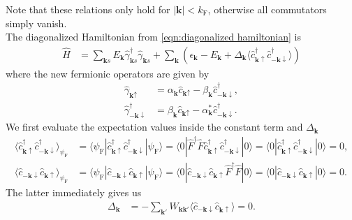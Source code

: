 \documentclass[english, parskip=full]{scrartcl}
\renewcommand{\bra}{}
\renewcommand{\braket}{}
\newcommand{\kla}{}
\newcommand{\tecxt}{}
\begin{document}
Note that these relations only hold for $|\textbf{k}| < k_\tecxt\text{F}$, otherwise all commutators simply vanish.
\\
The diagonalized Hamiltonian from \autoref{eqn:diagonalized hamiltonian} is 
\begin{align}
\hat{H} &= \sum_{\mathbf{k}s} E_{\mathbf{k}} \hat{\gamma}_{\mathbf{k}s}^\dagger \hat{\gamma}_{\mathbf{k}s} + \sum_{\textbf{k}}\kla\left(  \epsilon_\textbf{k} - E_\textbf{k} + \Delta_\textbf{k} \langle \hat{c}_{\mathbf{k}\uparrow}^\dagger \hat{c}_{-\mathbf{k}\downarrow}^\dagger \rangle \right)
\end{align}
where the new fermionic operators are given by
\begin{align}
\hat{\gamma}_{\textbf{k}\uparrow} &= \alpha_\textbf{k} \hat{c}_{\textbf{k}\uparrow} - \beta_\textbf{k} \hat{c}_{-\textbf{k}\downarrow}^\dagger,\\
\hat{\gamma}_{-\textbf{k}\downarrow}^\dagger &= \beta_\textbf{k} \hat{c}_{\textbf{k}\uparrow} - \alpha^\ast_\textbf{k} \hat{c}_{-\textbf{k}\downarrow}^\dagger.
\end{align}
We first evaluate the expectation values inside the constant term and $\Delta_\textbf{k}$
\begin{align}
\bra\langle \hat{c}_{\mathbf{k}\uparrow}^\dagger \hat{c}_{-\mathbf{k}\downarrow}^\dagger \rangle_{\psi_\tecxt\text{F}} &= \braket\langle \psi_\tecxt\text{F} | \hat{c}_{\mathbf{k}\uparrow}^\dagger \hat{c}_{-\mathbf{k}\downarrow}^\dagger | \psi_\tecxt\text{F} \rangle = \braket\langle 0 | \hat{F}^\dagger \hat{F} \hat{c}_{\mathbf{k}\uparrow}^\dagger \hat{c}_{-\mathbf{k}\downarrow}^\dagger | 0 \rangle = \braket\langle 0 | \hat{c}_{\mathbf{k}\uparrow}^\dagger \hat{c}_{-\mathbf{k}\downarrow}^\dagger | 0 \rangle = 0,\\
\bra\langle \hat{c}_{-\mathbf{k}\downarrow} \hat{c}_{\mathbf{k}\uparrow} \rangle_{\psi_\tecxt\text{F}} &= \braket\langle \psi_\tecxt\text{F} | \hat{c}_{-\mathbf{k}\downarrow} \hat{c}_{\mathbf{k}\uparrow} | \psi_\tecxt\text{F} \rangle = \braket\langle 0 | \hat{c}_{-\mathbf{k}\downarrow} \hat{c}_{\mathbf{k}\uparrow} \hat{F}^\dagger \hat{F} | 0 \rangle = \braket\langle 0 | \hat{c}_{-\mathbf{k}\downarrow} \hat{c}_{\mathbf{k}\uparrow} | 0 \rangle = 0.
\end{align}
The latter immediately gives us
\begin{align}
\Delta_\textbf{k} &= -\sum_{\textbf{k}'} W_{\textbf{k}\textbf{k}'} \bra\langle  \hat{c}_{-\mathbf{k}\downarrow} \hat{c}_{\mathbf{k}\uparrow} \rangle = 0.
\end{align}
\end{document}
